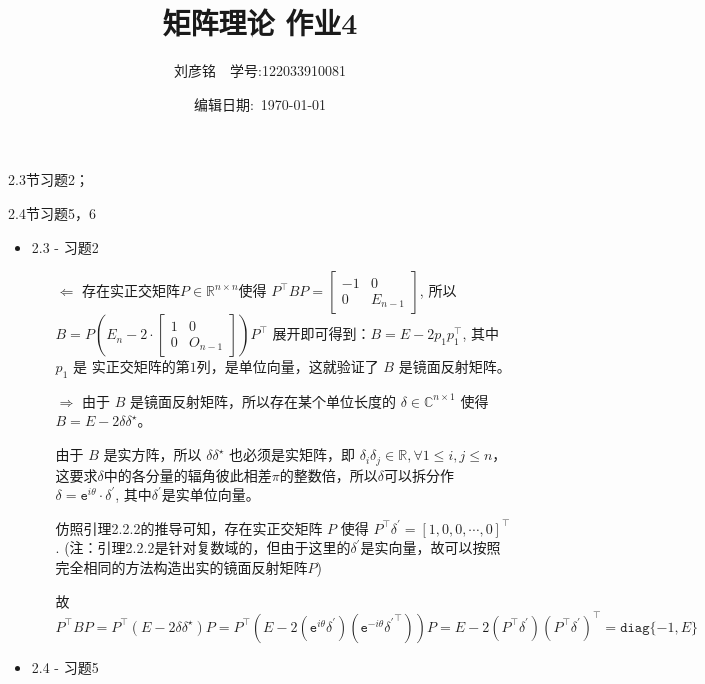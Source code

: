 \documentclass{article}
\title{矩阵理论 作业4}
\author{刘彦铭\ \ 学号:122033910081}
\date{编辑日期:\ \today}
\begin{document}
\maketitle

2.3节习题2；

2.4节习题5，6

\begin{spacing}{1.5}
\begin{itemize}
    \item 2.3 - 习题2
    
    \begin{itemize}
        \item [$\Leftarrow$]
            存在实正交矩阵$P\in\mathbb{R}^{n\times n}$使得 $P^\top BP = \left[\begin{array}{cc}-1&0\\0&E_{n-1}\end{array}\right]$, 所以 
            $B = P\left(E_n - 2\cdot\left[\begin{array}{cc}1&0\\0&O_{n-1}\end{array}\right]\right)P^\top$ 展开即可得到：$B = E - 2p_1p_1^\top$, 其中 $p_1$ 是
            实正交矩阵的第$1$列，是单位向量，这就验证了 $B$ 是镜面反射矩阵。
        \item [$\Rightarrow$] 由于 $B$ 是镜面反射矩阵，所以存在某个单位长度的 $\delta\in\mathbb{C}^{n\times 1}$ 使得 $B = E - 2\delta\delta^\star$。
        
        由于 $B$ 是实方阵，所以 $\delta\delta^\star$ 
        也必须是实矩阵，即 $\delta_i\delta_j\in\mathbb{R},\forall 1\leq i,j \leq n$，这要求$\delta$中的各分量的辐角彼此相差$\pi$的整数倍，所以$\delta$可以拆分作 $\delta=\mathtt{e}^{i\theta}\cdot \delta^\prime$,
        其中$\delta^\prime$是实单位向量。

        仿照引理2.2.2的推导可知，存在实正交矩阵 $P$ 使得 $P^\top\delta^\prime = \left[1, 0, 0, \cdots, 0\right]^\top$. (注：引理2.2.2是针对复数域的，但由于这里的$\delta^\prime$是实向量，故可以按照完全相同的方法构造出实的镜面反射矩阵$P$)
        
        故 $P^\top B P = P^\top(E-2\delta\delta^\star)P = P^\top \left(E - 2(\mathtt{e}^{i\theta}\delta^\prime)(\mathtt{e}^{-i\theta}{\delta^\prime}^\top)\right)P = E - 2(P^\top\delta^\prime)(P^\top\delta^\prime)^\top = \mathtt{diag}\{-1, E\}$

    \end{itemize}

    \item 2.4 - 习题5
    

\end{itemize}
\end{spacing}
\end{document}
